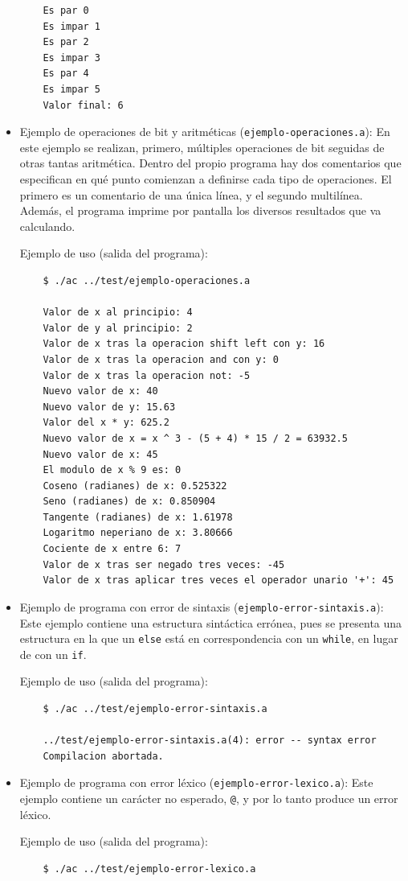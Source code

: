 \documentclass[12pt]{article}
\begin{document}
\begin{itemize}
\begin{verbatim}
    Es par 0
    Es impar 1
    Es par 2
    Es impar 3
    Es par 4
    Es impar 5
    Valor final: 6
    \end{verbatim}
    
    \item Ejemplo de operaciones de bit y aritméticas (\texttt{ejemplo-operaciones.a}): En este ejemplo se realizan, primero, múltiples operaciones de bit seguidas de otras tantas aritmética. Dentro del propio programa hay dos comentarios que especifican en qué punto comienzan a definirse cada tipo de operaciones. El primero es un comentario de una única línea, y el segundo multilínea. Además, el programa imprime por pantalla los diversos resultados que va calculando.\par
    Ejemplo de uso (salida del programa):
    \begin{verbatim}
    $ ./ac ../test/ejemplo-operaciones.a

    Valor de x al principio: 4
    Valor de y al principio: 2
    Valor de x tras la operacion shift left con y: 16
    Valor de x tras la operacion and con y: 0
    Valor de x tras la operacion not: -5
    Nuevo valor de x: 40
    Nuevo valor de y: 15.63
    Valor del x * y: 625.2
    Nuevo valor de x = x ^ 3 - (5 + 4) * 15 / 2 = 63932.5
    Nuevo valor de x: 45
    El modulo de x % 9 es: 0
    Coseno (radianes) de x: 0.525322
    Seno (radianes) de x: 0.850904
    Tangente (radianes) de x: 1.61978
    Logaritmo neperiano de x: 3.80666
    Cociente de x entre 6: 7
    Valor de x tras ser negado tres veces: -45
    Valor de x tras aplicar tres veces el operador unario '+': 45
    \end{verbatim}
    
    \item Ejemplo de programa con error de sintaxis (\texttt{ejemplo-error-sintaxis.a}): Este ejemplo contiene una estructura sintáctica errónea, pues se presenta una estructura en la que un \texttt{else} está en correspondencia con un \texttt{while}, en lugar de con un \texttt{if}.\par
    Ejemplo de uso (salida del programa):
    \begin{verbatim}
    $ ./ac ../test/ejemplo-error-sintaxis.a
    
    ../test/ejemplo-error-sintaxis.a(4): error -- syntax error
    Compilacion abortada.
    \end{verbatim}
    
    \item Ejemplo de programa con error léxico (\texttt{ejemplo-error-lexico.a}): Este ejemplo contiene un carácter no esperado, \texttt{@}, y por lo tanto produce un error léxico.\par
    Ejemplo de uso (salida del programa):
    \begin{verbatim}
    $ ./ac ../test/ejemplo-error-lexico.a
    

\end{verbatim}
\end{itemize}
\end{document}
